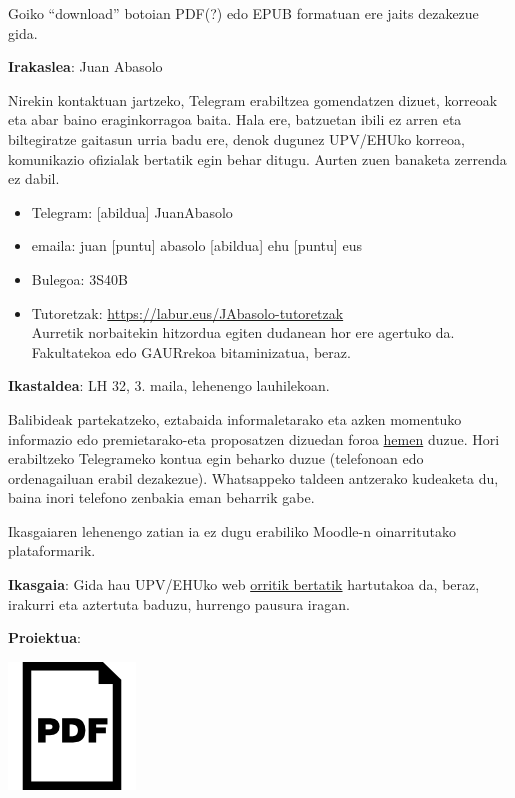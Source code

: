 \documentclass[
]{book}
\providecommand{\tightlist}{%
  \setlength{\itemsep}{0pt}\setlength{\parskip}{0pt}}
\begin{document}
Goiko ``download'' botoian PDF(?) edo EPUB formatuan ere jaits dezakezue gida.

\textbf{Irakaslea}: Juan Abasolo

Nirekin kontaktuan jartzeko, Telegram erabiltzea gomendatzen dizuet, korreoak eta abar baino eraginkorragoa baita. Hala ere, batzuetan ibili ez arren eta biltegiratze gaitasun urria badu ere, denok dugunez UPV/EHUko korreoa, komunikazio ofizialak bertatik egin behar ditugu. Aurten zuen banaketa zerrenda ez dabil.

\begin{itemize}
\tightlist
\item
  Telegram: {[}abildua{]} JuanAbasolo
\item
  emaila: juan {[}puntu{]} abasolo {[}abildua{]} ehu {[}puntu{]} eus
\item
  Bulegoa: 3S40B
\item
  Tutoretzak: \url{https://labur.eus/JAbasolo-tutoretzak}\\
  Aurretik norbaitekin hitzordua egiten dudanean hor ere agertuko da. Fakultatekoa edo GAURrekoa bitaminizatua, beraz.
\end{itemize}

\textbf{Ikastaldea}: LH 32, 3. maila, lehenengo lauhilekoan.

Balibideak partekatzeko, eztabaida informaletarako eta azken momentuko informazio edo premietarako-eta proposatzen dizuedan foroa \href{https://t.me/joinchat/CheQnxAMdJ206V3d4kDLkw}{hemen} duzue. Hori erabiltzeko Telegrameko kontua egin beharko duzue (telefonoan edo ordenagailuan erabil dezakezue). Whatsappeko taldeen antzerako kudeaketa du, baina inori telefono zenbakia eman beharrik gabe.

Ikasgaiaren lehenengo zatian ia ez dugu erabiliko Moodle-n oinarritutako plataformarik.

\textbf{Ikasgaia}: Gida hau UPV/EHUko web \href{https://www.ehu.eus/eu/lehen-hezkuntzako-gradua-bizkaia/kreditu-eta-irakasgaiak?p_redirect=consultaAsignatura\&p_cod_proceso=egr\&p_anyo_acad=20180\&p_ciclo=X\&p_curso=3\&p_cod_asignatura=25868}{orritik bertatik} hartutakoa da, beraz, irakurri eta aztertuta baduzu, hurrengo pausura iragan.

\textbf{Proiektua}:

\href{syllabusa/Syllabus_HDLH20-V1-1.pdf}{\includegraphics{assets/pdficon.png}}
\end{document}
